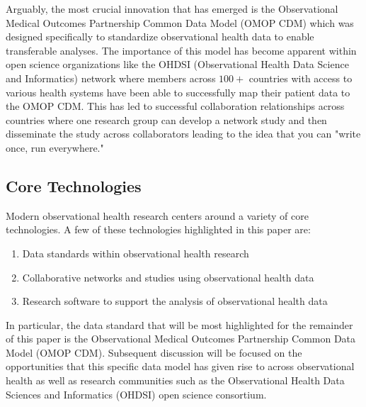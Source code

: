 \documentclass{juliacon}
\begin{document}
Arguably, the most crucial innovation that has emerged is the Observational Medical Outcomes Partnership Common Data Model (OMOP CDM) which was designed specifically to standardize observational health data to enable transferable analyses.
The importance of this model has become apparent within open science organizations like the OHDSI (Observational Health Data Science and Informatics) network where members across $100+$ countries with access to various health systems have been able to successfully map their patient data to the OMOP CDM.
This has led to successful collaboration relationships across countries where one research group can develop a network study and then disseminate the study across collaborators leading to the idea that you can "write once, run everywhere."

\subsection{Core Technologies}

Modern observational health research centers around a variety of core technologies.
A few of these technologies highlighted in this paper are:

\begin{enumerate}

\item Data standards within observational health research
\item Collaborative networks and studies using observational health data
\item Research software to support the analysis of observational health data

\end{enumerate}

In particular, the data standard that will be most highlighted for the remainder of this paper is the Observational Medical Outcomes Partnership Common Data Model (OMOP CDM).
Subsequent discussion will be focused on the opportunities that this specific data model has given rise to across observational health as well as research communities such as the Observational Health Data Sciences and Informatics (OHDSI) open science consortium.
\end{document}
